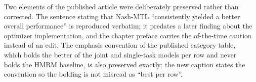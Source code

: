 Two elements of the published article were deliberately preserved rather than
corrected. The sentence stating that Nash-MTL ``consistently yielded a better
overall performance'' is reproduced verbatim; it predates a later finding about the
optimizer implementation, and the chapter preface carries the of-the-time caution
instead of an edit.
The emphasis convention of the published category table, which
bolds the better of the joint and single-task models per row and never bolds the HMRM
baseline, is also preserved exactly; the new caption states the convention so the
bolding is not misread as ``best per row''.

